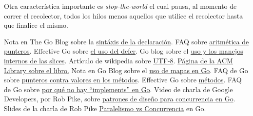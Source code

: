 \documentclass{article}
\begin{document}
Otra característica importante es \textit{stop-the-world} el cual pausa, al momento de correr el recolector, todos los hilos menos aquellos que utilice el recolector hasta que finalice el mismo. 
\newpage
\begin{thebibliography}{99}
 Nota en The Go Blog sobre la \href{http://blog.golang.org/gos-declaration-syntax}{sintáxis de la declaración}.
 FAQ sobre \href{https://golang.org/doc/faq#no_pointer_arithmetic}{aritmética de punteros}.
 Effective Go sobre \href{https://golang.org/doc/effective_go.html#defer}{el uso del defer}.
 Go blog sobre el \href{http://blog.golang.org/go-slices-usage-and-internals}{uso y los manejos internos de las slices}.
 Artículo de wikipedia sobre \href{https://es.wikipedia.org/wiki/UTF-8}{UTF-8}.
 \href{http://dl.acm.org/citation.cfm?id=1243380}{Página de la ACM Library sobre el libro.}
 Nota en Go Blog sobre el  \href{http://blog.golang.org/go-maps-in-action}{uso de mapas en Go}.
 FAQ de Go sobre \href{http://golang.org/doc/faq#methods_on_values_or_pointers}{punteros contra valores en los métodos}.
 Effective Go sobre \href{https://golang.org/doc/effective_go.html#methods}{métodos}.
 FAQ de Go sobre \href{https://golang.org/doc/faq#implements_interface}{por qué no hay ``implements'' en Go}.
 Video de charla de Google Developers, por Rob Pike, sobre \href{https://www.youtube.com/watch?v=f6kdp27TYZs}{patrones de diseño para concurrencia en Go}.
 Slides de la charla de Rob Pike \href{http://talks.golang.org/2012/waza.slide#45}{Paralelismo vs Concurrencia} en Go.
\end{thebibliography}
\end{document}
